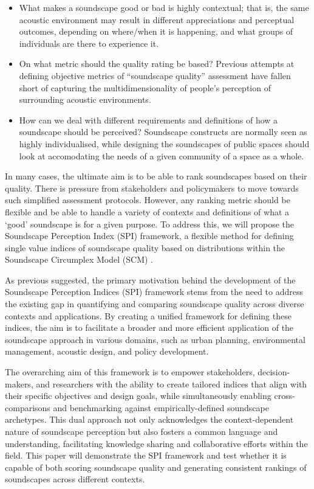 \documentclass[
  authoryear,
  preprint,
  3p]{elsarticle}
\providecommand{\tightlist}{%
  \setlength{\itemsep}{0pt}\setlength{\parskip}{0pt}}\usepackage{longtable,booktabs,array}
\begin{document}
\begin{itemize}
\tightlist
\item
  What makes a soundscape good or bad is highly contextual; that is, the
  same acoustic environment may result in different appreciations and
  perceptual outcomes, depending on where/when it is happening, and what
  groups of individuals are there to experience it.
\item
  On what metric should the quality rating be based? Previous attempts
  at defining objective metrics of ``soundscape quality'' assessment
  have fallen short of capturing the multidimensionality of people's
  perception of surrounding acoustic environments.
\item
  How can we deal with different requirements and definitions of how a
  soundscape should be perceived? Soundscape constructs are normally
  seen as highly individualised, while designing the soundscapes of
  public spaces should look at accomodating the needs of a given
  community of a space as a whole.
\end{itemize}

In many cases, the ultimate aim is to be able to rank soundscapes based
on their quality. There is pressure from stakeholders and policymakers
to move towards such simplified assessment protocols. However, any
ranking metric should be flexible and be able to handle a variety of
contexts and definitions of what a `good' soundscape is for a given
purpose. To address this, we will propose the Soundscape Perception
Index (SPI) framework, a flexible method for defining single value
indices of soundscape quality based on distributions within the
Soundscape Circumplex Model (SCM) \citep[\citet{Axelsson2012Swedish},
\citet{Mitchell2022How}]{Axelsson2010principal}.

As previous suggested, the primary motivation behind the development of
the Soundscape Perception Indices (SPI) framework stems from the need to
address the existing gap in quantifying and comparing soundscape quality
across diverse contexts and applications. By creating a unified
framework for defining these indices, the aim is to facilitate a broader
and more efficient application of the soundscape approach in various
domains, such as urban planning, environmental management, acoustic
design, and policy development.

The overarching aim of this framework is to empower stakeholders,
decision-makers, and researchers with the ability to create tailored
indices that align with their specific objectives and design goals,
while simultaneously enabling cross-comparisons and benchmarking against
empirically-defined soundscape archetypes. This dual approach not only
acknowledges the context-dependent nature of soundscape perception but
also fosters a common language and understanding, facilitating knowledge
sharing and collaborative efforts within the field. This paper will
demonstrate the SPI framework and test whether it is capable of both
scoring soundscape quality and generating consistent rankings of
soundscapes across different contexts.
\end{document}
